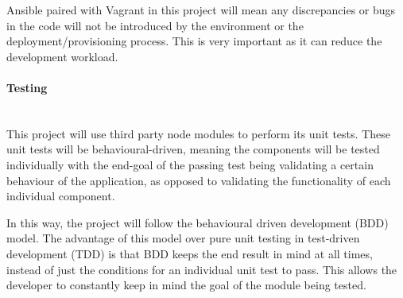 Ansible paired with Vagrant in this project will mean any discrepancies or bugs in the code will not be introduced by the environment or the deployment/provisioning process. This is very important as it can reduce the development workload. 

\paragraph{Testing}\mbox{}\\
This project will use third party node modules to perform its unit tests. These unit tests will be behavioural-driven, meaning the components will be tested individually with the end-goal of the passing test being validating a certain behaviour of the application, as opposed to validating the functionality of each individual component.

In this way, the project will follow the behavioural driven development (BDD) model. The advantage of this model over pure unit testing in test-driven development (TDD) is that BDD keeps the end result in mind at all times, instead of just the conditions for an individual unit test to pass. This allows the developer to constantly keep in mind the goal of the module being tested.
